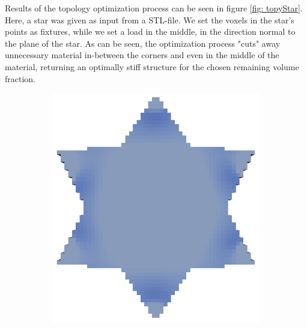 Results of the topology optimization process can be seen in figure \ref{fig: topyStar}. Here, a star was given as input from a STL-file. We set the voxels in the star's points as fixtures, while we set a load in the middle, in the direction normal to the plane of the star. As can be seen, the optimization process "cuts" away unnecessary material in-between the corners and even in the middle of the material, returning an optimally stiff structure for the chosen remaining volume fraction. 
\begin{figure}
\centering
\begin{subfigure}[c]{.24\linewidth}
\centering
  \includegraphics[width=\linewidth]{Pictures/TopOp/Star_Optimized0_Trans.png}
\end{subfigure}%
\begin{subfigure}[c]{.24\linewidth}
\centering

\end{subfigure}
\end{figure}
